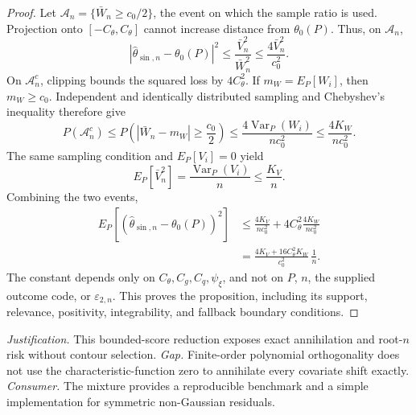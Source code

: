 \documentclass{article}
\begin{document}
\begin{proof}
Let \(\mathcal A_n=\{\bar W_n\ge c_0/2\}\), the event on which the sample ratio is used. Projection onto \([-C_{\theta},C_{\theta}]\) cannot increase distance from \(\theta_0(P)\). Thus, on \(\mathcal A_n\),
\[
|\widehat\theta_{\sin,n}-\theta_0(P)|^2
\le\frac{\bar V_n^2}{\bar W_n^2}
\le\frac{4\bar V_n^2}{c_0^2}.
\]
On \(\mathcal A_n^c\), clipping bounds the squared loss by \(4C_{\theta}^2\). If \(m_W=E_P[W_i]\), then \(m_W\ge c_0\). Independent and identically distributed sampling and Chebyshev's inequality therefore give
\[
P(\mathcal A_n^c)
\le P\!\left(|\bar W_n-m_W|\ge\frac{c_0}{2}\right)
\le\frac{4\operatorname{Var}_P(W_i)}{nc_0^2}
\le\frac{4K_W}{nc_0^2}.
\]
The same sampling condition and \(E_P[V_i]=0\) yield
\[
E_P[\bar V_n^2]
=\frac{\operatorname{Var}_P(V_i)}{n}
\le\frac{K_V}{n}.
\]
Combining the two events,
\[
\begin{aligned}
E_P[(\widehat\theta_{\sin,n}-\theta_0(P))^2]
&\le\frac{4K_V}{nc_0^2}
+4C_{\theta}^2\frac{4K_W}{nc_0^2}\\
&=\frac{4K_V+16C_{\theta}^2K_W}{c_0^2}\,\frac1n.
\end{aligned}
\]
The constant depends only on \(C_{\theta},C_g,C_q,\psi_{\xi}\), and not on \(P\), \(n\), the supplied outcome code, or \(\varepsilon_{2,n}\). This proves the proposition, including its support, relevance, positivity, integrability, and fallback boundary conditions.
\end{proof}
\par\smallskip\noindent \textit{Justification.} This bounded-score reduction exposes exact annihilation and root-\(n\) risk without contour selection. \textit{Gap.} Finite-order polynomial orthogonality does not use the characteristic-function zero to annihilate every covariate shift exactly. \textit{Consumer.} The mixture provides a reproducible benchmark and a simple implementation for symmetric non-Gaussian residuals.
\end{document}
